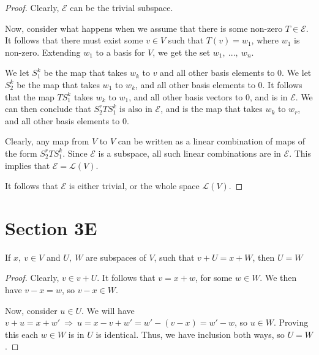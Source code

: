 \documentclass[10pt, oneside]{article}
\newenvironment{problem}[2][Problem]{\begin{trivlist}
\item[\hskip \labelsep {\bfseries #1}\hskip \labelsep {\bfseries #2.}]}{\end{trivlist}}
\begin{document}
    \begin{proof}

      Clearly, $\mathcal{E}$ can be the trivial subspace.
      \newline

      Now, consider what happens when we assume that there is some non-zero $T \in \mathcal{E}$. It follows that there must exist some $v \in V$ such that
      $T(v) = w_1$, where $w_1$ is non-zero. Extending $w_1$ to a basis for $V$, we get the set $w_1, \ ..., \ w_n$.
      \newline

      We let $S^k_1$ be the map that takes $w_k$ to $v$ and all other basis elements to $0$. We let $S^k_2$ be the map that takes $w_1$ to $w_k$, and all other
      basis elements to $0$. It follows that the map $T S^k_1$ takes $w_k$ to $w_1$, and all other basis vectors to $0$, and is in $\mathcal{E}$. We can then conclude that
      $S^r_2 T S^k_1$ is also in $\mathcal{E}$, and is the map that takes $w_k$ to $w_r$, and all other basis elements to $0$.
      \newline

      Clearly, any map from $V$ to $V$ can be written as a linear combination of maps of the form $S^r_2 T S^k_1$. Since $\mathcal{E}$ is a subspace, all such
      linear combinations are in $\mathcal{E}$. This implies that $\mathcal{E} = \mathcal{L}(V)$.
      \newline

      It follows that $\mathcal{E}$ is either trivial, or the whole space $\mathcal{L}(V)$.
      \end{proof}

    \section{Section 3E}

    \begin{problem}{3.7}
      If $x, \ v \in V$ and $U, \ W$ are subspaces of $V$, such that $v + U = x + W$, then $U = W$
    \end{problem}

    \begin{proof}
      Clearly, $v \in v + U$. It follows that $v = x + w$, for some $w \in W$. We then have $v - x = w$, so $v - x \in W$.
      \newline

      Now, consider $u \in U$. We will have $v + u = x + w' \ \Rightarrow \ u = x - v + w' = w' - (v - x) = w' - w$, so $u \in W$. Proving
      this each $w \in W$ is in $U$ is identical. Thus, we have inclusion both ways, so $U = W$.
      \end{proof}
    
\end{document}
